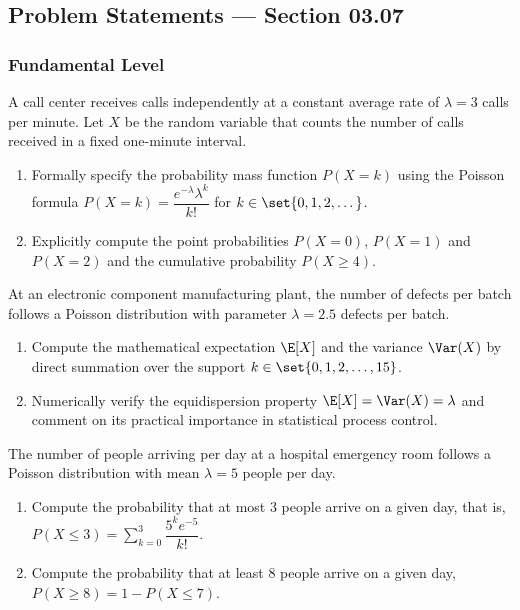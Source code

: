 \subsection*{Problem Statements --- Section 03.07}

\subsubsection*{Fundamental Level}

\begin{problema}
	\label{prob:3.7.1}
	A call center receives calls independently at a constant average rate of $\lambda = 3$ calls per minute. Let $X$ be the random variable that counts the number of calls received in a fixed one-minute interval.
	\begin{enumerate}
		\item Formally specify the probability mass function $P(X = k)$ using the Poisson formula $P(X = k) = \dfrac{e^{-\lambda}\lambda^{k}}{k!}$ for $k \in \set{0, 1, 2, \dots}$.
		\item Explicitly compute the point probabilities $P(X = 0)$, $P(X = 1)$ and $P(X = 2)$ and the cumulative probability $P(X \ge 4)$.
	\end{enumerate}
\end{problema}

\begin{problema}
	\label{prob:3.7.2}
	At an electronic component manufacturing plant, the number of defects per batch follows a Poisson distribution with parameter $\lambda = 2.5$ defects per batch.
	\begin{enumerate}
		\item Compute the mathematical expectation $\E[X]$ and the variance $\Var(X)$ by direct summation over the support $k \in \set{0, 1, 2, \dots, 15}$.
		\item Numerically verify the equidispersion property $\E[X] = \Var(X) = \lambda$ and comment on its practical importance in statistical process control.
	\end{enumerate}
\end{problema}

\begin{problema}
	\label{prob:3.7.3}
	The number of people arriving per day at a hospital emergency room follows a Poisson distribution with mean $\lambda = 5$ people per day.
	\begin{enumerate}
		\item Compute the probability that at most $3$ people arrive on a given day, that is, $P(X \le 3) = \sum_{k=0}^{3} \dfrac{5^{k} e^{-5}}{k!}$.
		\item Compute the probability that at least $8$ people arrive on a given day, $P(X \ge 8) = 1 - P(X \le 7)$.
	\end{enumerate}
\end{problema}

